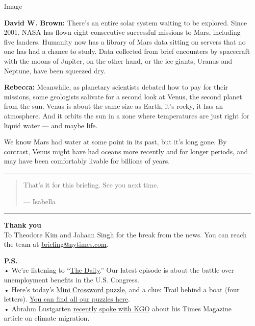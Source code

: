 Image

\textbf{David W. Brown:} There's an entire solar system waiting to be
explored. Since 2001, NASA has flown eight consecutive successful
missions to Mars, including five landers. Humanity now has a library of
Mars data sitting on servers that no one has had a chance to study. Data
collected from brief encounters by spacecraft with the moons of Jupiter,
on the other hand, or the ice giants, Uranus and Neptune, have been
squeezed dry.

\textbf{Rebecca:} Meanwhile, as planetary scientists debated how to pay
for their missions, some geologists salivate for a second look at Venus,
the second planet from the sun. Venus is about the same size as Earth,
it's rocky, it has an atmosphere. And it orbits the sun in a zone where
temperatures are just right for liquid water --- and maybe life.

We know Mars had water at some point in its past, but it's long gone. By
contrast, Venus might have had oceans more recently and for longer
periods, and may have been comfortably livable for billions of years.

\begin{center}\rule{0.5\linewidth}{\linethickness}\end{center}

\begin{quote}
That's it for this briefing. See you next time.

--- Isabella
\end{quote}

\begin{center}\rule{0.5\linewidth}{\linethickness}\end{center}

\textbf{Thank you}\\
To Theodore Kim and Jahaan Singh for the break from the news. You can
reach the team at
\href{mailto:briefing+midnight@nytimes.com?subject=Briefing\%20Feedback}{briefing@nytimes.com}.

\textbf{P.S.}\\
• We're listening to ``\href{https://www.nytimes.com/thedaily}{The
Daily}.'' Our latest episode is about the battle over unemployment
benefits in the U.S. Congress.\\
• Here's today's
\href{https://www.nytimes.com/crosswords/game/mini}{Mini Crossword
puzzle}, and a clue: Trail behind a boat (four letters).
\href{https://www.nytimes.com/crosswords}{You can find all our puzzles
here}.\\
• Abrahm Lustgarten
\href{https://podcasts.apple.com/us/podcast/july-24-2020-global-warming-is-forcing-people-to-move/id1370171105?i=1000486012549}{recently
spoke with KGO} about his Times Magazine article on climate migration.

